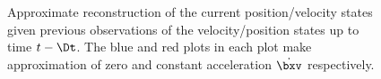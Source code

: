 \begin{figure}[t]
{
\label{fig:veldiff}
}
%
\caption{Approximate reconstruction of the current position/velocity states given previous observations of the velocity/position states up to time $t-\Dt$. The blue and red plots in each plot make approximation of zero and constant acceleration $\dot\bxv$ respectively. }
\end{figure}


